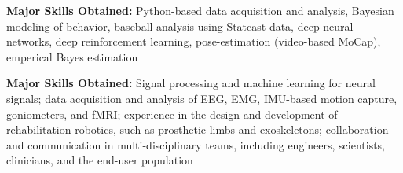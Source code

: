 
{\small{\color{skills}\textbf{Major Skills Obtained:}} Python-based data acquisition and analysis, Bayesian modeling of behavior, baseball analysis using Statcast data, deep neural networks, deep reinforcement learning, pose-estimation (video-based MoCap), emperical Bayes estimation} \\

\vspace{-0.5em}
\divider

{\small{\color{skills}\textbf{Major Skills Obtained:}} Signal processing and machine learning for neural signals; data acquisition and analysis of EEG, EMG, IMU-based motion capture, goniometers, and fMRI; experience in the design and development of rehabilitation robotics, such as prosthetic limbs and exoskeletons; collaboration and communication in multi-disciplinary teams, including engineers, scientists, clinicians, and the end-user population} \\
